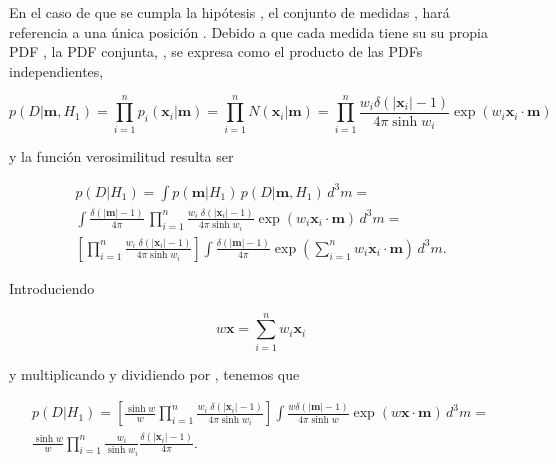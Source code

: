 En el caso de que se cumpla la hipótesis , el conjunto de medidas , hará referencia a una única posición . Debido a que cada medida  tiene su su propia PDF , la PDF conjunta, , se expresa como el producto de las PDFs independientes,

\begin{equation*}
    p(D|\boldsymbol{m},H_1)=\prod_{i=1}^{n} p_i({\boldsymbol{x}}_i|\boldsymbol{m})=\prod_{i=1}^{n}N({\boldsymbol{x}}_i|\boldsymbol{m})=\prod_{i=1}^{n}\frac{w_i \delta (\left|{\boldsymbol{x}}_i \right|-1)}{4\pi \sinh{w_i}} \exp{(w_i {\boldsymbol{x}}_i\cdot \boldsymbol{m})}
\end{equation*}

y la función verosimilitud  resulta ser

\vspace{-4mm}

\begin{multline*}
    p(D|H_1)=\int p(\boldsymbol{m}|H_1)\,p(D|\boldsymbol{m},H_1)\,d^3m
    =\\
    \int \frac{\delta (\left|\boldsymbol{m} \right|-1)}{4\pi}\,\prod_{i=1}^{n} \frac{w_{i} \;\delta (\left|\boldsymbol{x}_{i} \right|-1)}{4\pi \sinh{w_{i}}} \exp{\left(w_{i}\boldsymbol{x}_{i}\cdot \boldsymbol{m}\right)}\,d^3m
    = \\
    \left[ \prod_{i=1}^{n} \frac{w_{i} \;\delta (\left|\boldsymbol{x}_{i} \right|-1)}{4\pi \sinh{w_{i}}} \right] \int{\frac{\delta (\left|\boldsymbol{m} \right|-1)}{4\pi}} \exp{ \left(\sum_{i=1}^{n}{w_{i}{\boldsymbol{x}}_{i}\cdot \boldsymbol{m}}\right)}\,d^3m.
\end{multline*}

Introduciendo

\begin{equation*}
    w\boldsymbol{x}=\sum_{i=1}^{n}w_i\boldsymbol{x}_i
\end{equation*}

y multiplicando y dividiendo por , tenemos que

\begin{multline*}
    p(D|H_1)=\left[\frac{\sinh w}{w}\prod_{i=1}^{n} \frac{w_{i} \;\delta (\left|\boldsymbol{x}_{i} \right|-1)}{4\pi \sinh{w_i}}\right] \int{\frac{w \delta (\left|\boldsymbol{m} \right|-1)}{4\pi\sinh{w}}} \exp{ \left(w \boldsymbol{x}\cdot \boldsymbol{m}\right)}\,d^3m
    =\\
    \frac{\sinh{w}}{w}\prod_{i=1}^{n}\frac{w_i}{\sinh{w_i}}\frac{\delta (\left|\boldsymbol{x}_i \right|-1)}{4\pi}.
\end{multline*}

